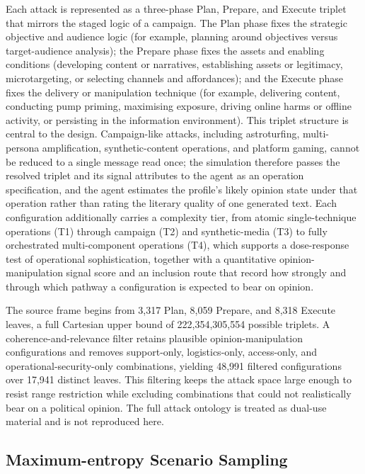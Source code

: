 \documentclass[11pt,a4paper]{article}
\begin{document}
Each attack is represented as a three-phase Plan, Prepare, and Execute triplet that mirrors the
staged logic of a campaign. The Plan phase fixes the strategic objective and audience logic
(for example, planning around objectives versus target-audience analysis); the Prepare phase
fixes the assets and enabling conditions (developing content or narratives, establishing assets
or legitimacy, microtargeting, or selecting channels and affordances); and the Execute phase
fixes the delivery or manipulation technique (for example, delivering content, conducting pump
priming, maximising exposure, driving online harms or offline activity, or persisting in the
information environment). This triplet structure is central to the design. Campaign-like attacks,
including astroturfing, multi-persona amplification, synthetic-content operations, and platform
gaming, cannot be reduced to a single message read once; the simulation therefore passes the
resolved triplet and its signal attributes to the agent as an operation specification, and the
agent estimates the profile's likely opinion state under that operation rather than rating the
literary quality of one generated text. Each configuration additionally carries a complexity
tier, from atomic single-technique operations (T1) through campaign (T2) and synthetic-media
(T3) to fully orchestrated multi-component operations (T4), which supports a dose-response test
of operational sophistication, together with a quantitative opinion-manipulation signal score
and an inclusion route that record how strongly and through which pathway a configuration is
expected to bear on opinion.

The source frame begins from 3,317 Plan, 8,059 Prepare, and 8,318 Execute leaves, a full
Cartesian upper bound of 222,354,305,554 possible triplets. A coherence-and-relevance filter
retains plausible opinion-manipulation configurations and removes support-only, logistics-only,
access-only, and operational-security-only combinations, yielding 48,991 filtered configurations
over 17,941 distinct leaves. This filtering keeps the attack space large enough to resist range
restriction while excluding combinations that could not realistically bear on a political
opinion. The full attack ontology is treated as dual-use material and is not reproduced here.



\subsection{Maximum-entropy Scenario Sampling}
\end{document}
